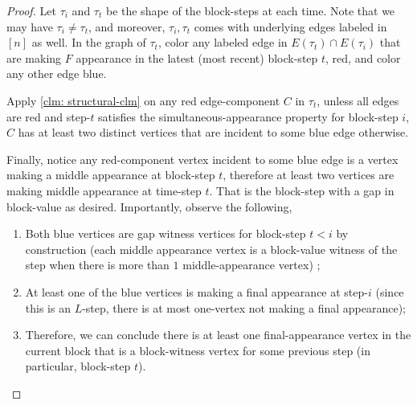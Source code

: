 \documentclass[12pt]{article}
\begin{document}
\begin{proof} \label{proof: simul-appearance}
Let $\tau_i$ and $\tau_t$ be the shape of the block-steps at each time. Note that we may have $\tau_i\neq \tau_t$, and moreover, $\tau_i, \tau_t$ comes with underlying edges labeled in $[n]$ as well.
 In the graph of $\tau_t$, color any labeled edge in $E(\tau_t)\cap E(\tau_i)$ that are making $F$ appearance in the latest (most recent) block-step $t$,  red, and color any other edge blue.

%
	

	Apply \cref{clm: structural-clm} on any red edge-component $C$ in $\tau_t$,  unless all edges are red and step-$t$ satisfies the simultaneous-appearance property for block-step $i$,  $C$ has at least two
distinct vertices that are incident to some blue edge otherwise.


Finally, notice any red-component vertex incident to some blue edge is a vertex making a middle appearance at block-step $t$, therefore at least two vertices are making middle appearance at time-step $t$. That is the block-step with a gap in block-value as desired. Importantly, observe the following,
\begin{enumerate}
	\item  Both blue vertices are gap witness vertices for block-step $t<i$ by construction (each middle appearance vertex is a block-value witness of the step when there is more than $1$ middle-appearance vertex) ;
	\item At least one of the blue vertices is making a final appearance at step-$i$ (since this is an $L$-step, there is at most one-vertex not making a final appearance);
	\item Therefore, we can conclude there is at least one final-appearance vertex in the current block that is a block-witness vertex for some previous step (in particular, block-step $t$).
\end{enumerate}
	 \end{proof}
\end{document}
